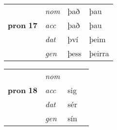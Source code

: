 \begin{center}
\begin{minipage}[t]{.45\textwidth}
\begin{tabular}{l>{\footnotesize\itshape}l>{\small}l>{\small}l}
\multirow{3}{*}{{{\textbf{pron} \Large{\textbf{17}}}}}  &  nom & það & þau   \\*
 & acc &  það  & þau  \\*
 & dat & því & þeim   \\*
 & gen & þess  & þeirra  \\
\hline
\end{tabular}
\end{minipage}\hfil
\begin{minipage}[t]{.45\textwidth}
\begin{tabular}{l>{\footnotesize\itshape}l>{\small}ll}
\hline
\multirow{3}{*}{{{\textbf{pron} \Large{\textbf{18}}}}}  &  nom &  &    \\*
 & acc &  sig  &   \\*
 & dat & sér &    \\*
 & gen & sín  &   \\
 \hline
\end{tabular}
\end{minipage}
\end{center}
